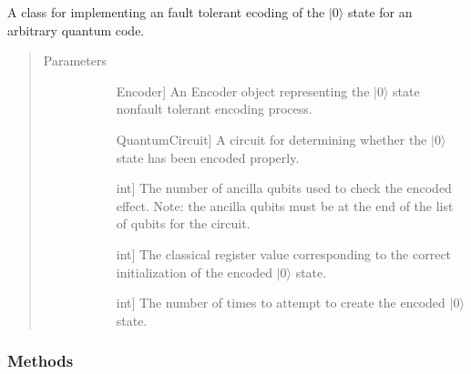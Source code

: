 \documentclass[letterpaper,10pt,english]{sphinxmanual}
\begin{document}
\begin{fulllineitems}
\label{\detokenize{Base:BaseFaultTolerance.FaultTolerantEncoder}}
\sphinxAtStartPar
A class for implementing an fault tolerant ecoding of the \(|0\rangle\) state for an arbitrary quantum code.
\begin{quote}\begin{description}
\item[{Parameters}] \leavevmode\begin{description}
\item[{}] \leavevmode{[}Encoder{]}
\sphinxAtStartPar
An Encoder object representing the \(|0\rangle\) state non\sphinxhyphen{}fault tolerant encoding process.

\item[{}] \leavevmode{[}QuantumCircuit{]}
\sphinxAtStartPar
A circuit for determining whether the \(|0\rangle\) state has been encoded properly.

\item[{}] \leavevmode{[}int{]}
\sphinxAtStartPar
The number of ancilla qubits used to check the encoded effect. 
Note: the ancilla qubits must be at the end of the list of qubits for the circuit.

\item[{}] \leavevmode{[}int{]}
\sphinxAtStartPar
The classical register value corresponding to the correct initialization of the encoded \(|0\rangle\) state.

\item[{}] \leavevmode{[}int{]}
\sphinxAtStartPar
The number of times to attempt to create the encoded \(|0\rangle\) state.

\end{description}

\end{description}\end{quote}
\subsubsection*{Methods}



\end{fulllineitems}
\end{document}
